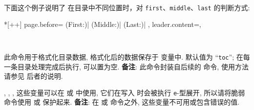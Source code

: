 下面这个例子说明了 \ztex{} 在目录中不同位置时，对 \texttt{first}、\texttt{middle}、\texttt{last} 
的判断方式:
\begin{DocExample}*[++]
\begingroup\ExplSyntaxOn
\ztocformat{\section, \subsection, \subsubsection}
  {
    page.before=
      {
        {\color{red}(First:)}|
        {\color{blue}(Middle:)}|
        {\color{purple}(Last:)}|
      },
    leader.content={},
  }
\ExplSyntaxOff
{}
\endgroup
\end{DocExample}



\begin{function}[added=2025-09-15, updated=2025-09-19]{\ztocgroupparser}
  \begin{syntax}
    \cmd{\ztocgroupparser}
    ~~~~
    ~~~~
  \end{syntax}
  此命令用于格式化目录数据, 格式化后的数据保存于 \cmd{\ztocgroupparserOutput} 变量中. 
   默认值为 ``\texttt{toc}'';  在每一条目录处理完成后执行, 可以置为空.
  \textbf{备注}: 此命令封装自后续的  命令, 使用方法请参见
  后者的说明.
\end{function}


\begin{function}[added=2025-09-15, EXP]{
    \gparserclass,
    \gparserindex,
    \gparseranchor,
  }
  这些变量可以在  或 \cmd{\ztocgroupparser} 中使用, 它们在写入 
  时会被执行 \texttt{e}-型展开, 所以请将脆弱命令使用 \cmd{\noexpand} 或 \cmd{\unexpanded} 保护起来.
  \textbf{备注}: 在  或 \cmd{\ztocgroupparser} 命令之外, 这些变量不可用或包含错误的值.
\end{function}



